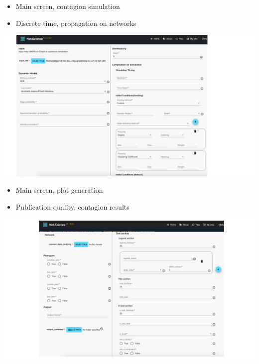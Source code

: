 \documentclass[landscape,paperwidth=70in,paperheight=46in,fontscale=0.225]{baposter} %
\begin{document}
\begin{poster}
{\begin{minipage}{.29\textwidth}
\begin{itemize}[leftmargin=*,noitemsep,topsep=0pt]
\item Main screen, contagion simulation
\item Discrete time, propagation on networks
\end{itemize}
\end{minipage}
\hfill
\begin{minipage}{.71\textwidth}         
\includegraphics[scale=0.25]{figures/csonnet-model-seeds.pdf} 
\end{minipage}
\begin{minipage}{.29\textwidth}
\begin{itemize}[leftmargin=*,noitemsep,topsep=0pt]
\item Main screen, plot generation
\item Publication quality, contagion results
\end{itemize}
\end{minipage}
\hfill
\begin{minipage}{.71\textwidth}  
\vspace{5mm}
\includegraphics[scale=0.26]{figures/plot_input.pdf}
\end{minipage}
\hfill
\vspace{5mm}

}
\end{poster}
\end{document}
